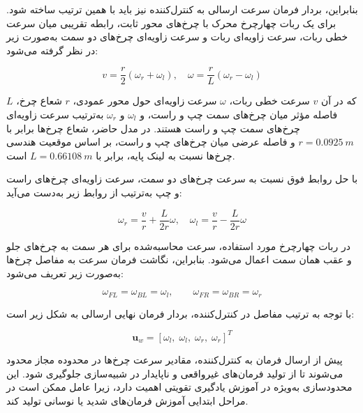 بنابراین، بردار فرمان سرعت ارسالی به کنترل‌کننده نیز باید با همین ترتیب ساخته شود. برای یک ربات چهارچرخ محرک با چرخ‌های محور ثابت، رابطه تقریبی میان سرعت خطی ربات، سرعت زاویه‌ای ربات و سرعت زاویه‌ای چرخ‌های دو سمت به‌صورت زیر در نظر گرفته می‌شود:

\begin{equation}
	v = \frac{r}{2}\left(\omega_r + \omega_l\right),
	\quad
	\omega = \frac{r}{L}\left(\omega_r - \omega_l\right)
	\label{eq:skid_velocities}
\end{equation}

که در آن \(v\) سرعت خطی ربات، \(\omega\) سرعت زاویه‌ای حول محور عمودی، \(r\) شعاع چرخ، \(L\) فاصله مؤثر میان چرخ‌های سمت چپ و راست، و \(\omega_l\) و \(\omega_r\) به‌ترتیب سرعت زاویه‌ای چرخ‌های سمت چپ و راست هستند. در مدل حاضر، شعاع چرخ‌ها برابر با \(r=0.0925~m\) و فاصله عرضی میان چرخ‌های چپ و راست، بر اساس موقعیت هندسی چرخ‌ها نسبت به لینک پایه، برابر با \(L=0.66108~m\) است.

با حل روابط فوق نسبت به سرعت چرخ‌های دو سمت، سرعت زاویه‌ای چرخ‌های راست و چپ به‌ترتیب از روابط زیر به‌دست می‌آید:

\begin{equation}
	\omega_r = \frac{v}{r} + \frac{L}{2r}\omega,
	\quad
	\omega_l = \frac{v}{r} - \frac{L}{2r}\omega
	\label{eq:wheel_velocities}
\end{equation}

در ربات چهارچرخ مورد استفاده، سرعت محاسبه‌شده برای هر سمت به چرخ‌های جلو و عقب همان سمت اعمال می‌شود. بنابراین، نگاشت فرمان سرعت به مفاصل چرخ‌ها به‌صورت زیر تعریف می‌شود:

\begin{equation}
	\omega_{FL} = \omega_{BL} = \omega_l,
	\qquad
	\omega_{FR} = \omega_{BR} = \omega_r
	\label{eq:four_wheel_velocity_mapping}
\end{equation}

با توجه به ترتیب مفاصل در کنترل‌کننده، بردار فرمان نهایی ارسالی به شکل زیر است:

\begin{equation}
	\mathbf{u}_{w} =
	\left[
	\omega_l,\;
	\omega_l,\;
	\omega_r,\;
	\omega_r
	\right]^T
	\label{eq:wheel_velocity_command_vector}
\end{equation}

پیش از ارسال فرمان به کنترل‌کننده، مقادیر سرعت چرخ‌ها در محدوده مجاز محدود می‌شوند تا از تولید فرمان‌های غیرواقعی و ناپایدار در شبیه‌سازی جلوگیری شود. این محدودسازی به‌ویژه در آموزش یادگیری تقویتی اهمیت دارد، زیرا عامل ممکن است در مراحل ابتدایی آموزش فرمان‌های شدید یا نوسانی تولید کند.

